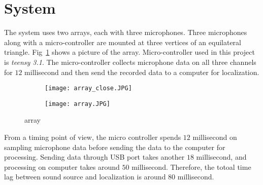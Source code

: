 \section{System}
The system uses two arrays, each with three microphones. Three microphones along with a micro-controller are mounted at three vertices of an equilateral triangle. Fig~\ref{fig:setup_array} shows a picture of the array. Micro-controller used in this project is \emph{teensy 3.1}. The micro-controller collects microphone data on all three channels for $12$ millisecond and then send the recorded data to a computer for localization. 

\begin{figure}[]
  \centering
  \begin{subfigure}[]{.2\textwidth}
    \texttt{[image: array\_close.JPG]}
  \end{subfigure}
  \begin{subfigure}[]{.2\textwidth}
    \texttt{[image: array.JPG]}
  \end{subfigure}
  \caption{array}
  \label{fig:setup_array}
\end{figure}

From a timing point of view, the micro controller spends $12$ millisecond on sampling microphone data before sending the data to the computer for processing. Sending data through USB port takes another $18$ millisecond, and processing on computer takes around $50$ millisecond. Therefore, the totoal time lag between sound source and localization is around $80$ millisecond.
